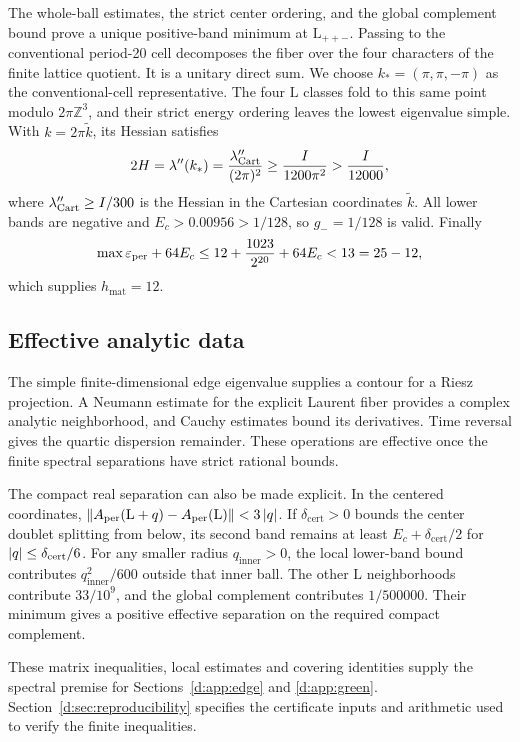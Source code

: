 The whole-ball estimates, the strict center ordering, and the global
complement bound prove a unique positive-band minimum at \(\mathrm{L}_{++-}\).
Passing to the conventional period-20 cell decomposes the fiber over the
four characters of the finite lattice quotient. It is a unitary direct
sum. We choose \(k_*=(\pi,\pi,-\pi)\) as the conventional-cell
representative. The four \(\mathrm{L}\) classes fold to this same point modulo
\(2\pi\mathbb Z^3\), and their
strict energy ordering leaves the lowest eigenvalue simple. With
\(k=2\pi\tilde k\), its Hessian satisfies
\[
 2H=\lambda''(k_*)=\frac{\lambda''_{\rm Cart}}{(2\pi)^2}
 \ge\frac{I}{1200\pi^2}>\frac{I}{12000},
\]
where \(\lambda''_{\rm Cart}\ge I/300\) is the Hessian in the Cartesian coordinates \(\tilde k\).
All lower bands are negative and \(E_c>0.00956>1/128\), so
\(g_-=1/128\) is valid. Finally
\[
 \max\varepsilon_{\mathrm{per}}+64E_c
 \le12+\frac{1023}{2^{20}}+64E_c<13=25-12,
\]
which supplies \(h_{\mathrm{mat}}=12\).

\subsection{Effective analytic data}

The simple finite-dimensional edge eigenvalue supplies a contour for a
Riesz projection. A Neumann estimate for the explicit Laurent fiber
provides a complex analytic neighborhood, and Cauchy estimates bound its
derivatives. Time reversal gives the quartic dispersion remainder.
These operations are effective once the finite spectral separations have
strict rational bounds.

The compact real separation can also be made explicit. In the centered
coordinates,
\(\left\lVert A_{\rm per}(\mathrm{L}+q)-A_{\rm per}(\mathrm{L})\right\rVert<3\left\lvert q\right\rvert\).
If \(\delta_{\mathrm{cert}}>0\) bounds the center doublet splitting
from below, its second band remains at least
\(E_c+\delta_{\mathrm{cert}}/2\) for
\(\left\lvert q\right\rvert\le\delta_{\mathrm{cert}}/6\).
For any smaller radius \(q_{\mathrm{inner}}>0\), the local lower-band
bound contributes \(q_{\mathrm{inner}}^2/600\) outside that inner ball.
The other \(\mathrm{L}\) neighborhoods contribute \(33/10^9\), and the global
complement contributes \(1/500000\). Their minimum gives a positive
effective separation on the required compact complement.

These matrix inequalities, local estimates and covering identities supply
the spectral premise for Sections~\ref{d:app:edge} and \ref{d:app:green}.
Section~\ref{d:sec:reproducibility} specifies the certificate inputs and
arithmetic used to verify the finite inequalities.

